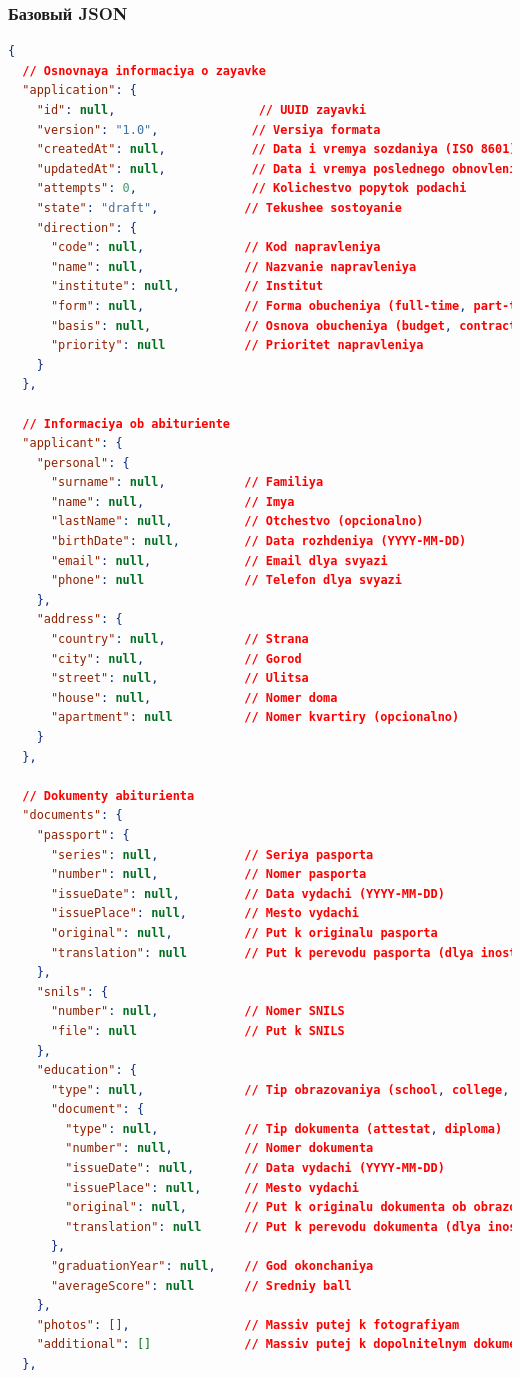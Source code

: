 \documentclass[areasetadvanced]{scrartcl}
\begin{document}
\subsubsection{Базовый JSON}
\begin{lstlisting}[language=json,caption={Bazovyi JSON format zayavki},label={lst:json-base}]
{
  // Osnovnaya informaciya o zayavke
  "application": {
    "id": null,                    // UUID zayavki
    "version": "1.0",             // Versiya formata
    "createdAt": null,            // Data i vremya sozdaniya (ISO 8601)
    "updatedAt": null,            // Data i vremya poslednego obnovleniya (ISO 8601)
    "attempts": 0,                // Kolichestvo popytok podachi
    "state": "draft",            // Tekushee sostoyanie
    "direction": {
      "code": null,              // Kod napravleniya
      "name": null,              // Nazvanie napravleniya
      "institute": null,         // Institut
      "form": null,              // Forma obucheniya (full-time, part-time)
      "basis": null,             // Osnova obucheniya (budget, contract)
      "priority": null           // Prioritet napravleniya
    }
  },

  // Informaciya ob abituriente
  "applicant": {
    "personal": {
      "surname": null,           // Familiya
      "name": null,              // Imya
      "lastName": null,          // Otchestvo (opcionalno)
      "birthDate": null,         // Data rozhdeniya (YYYY-MM-DD)
      "email": null,             // Email dlya svyazi
      "phone": null              // Telefon dlya svyazi
    },
    "address": {
      "country": null,           // Strana
      "city": null,              // Gorod
      "street": null,            // Ulitsa
      "house": null,             // Nomer doma
      "apartment": null          // Nomer kvartiry (opcionalno)
    }
  },

  // Dokumenty abiturienta
  "documents": {
    "passport": {
      "series": null,            // Seriya pasporta
      "number": null,            // Nomer pasporta
      "issueDate": null,         // Data vydachi (YYYY-MM-DD)
      "issuePlace": null,        // Mesto vydachi
      "original": null,          // Put k originalu pasporta
      "translation": null        // Put k perevodu pasporta (dlya inostrancev)
    },
    "snils": {
      "number": null,            // Nomer SNILS
      "file": null               // Put k SNILS
    },
    "education": {
      "type": null,              // Tip obrazovaniya (school, college, university)
      "document": {
        "type": null,            // Tip dokumenta (attestat, diploma)
        "number": null,          // Nomer dokumenta
        "issueDate": null,       // Data vydachi (YYYY-MM-DD)
        "issuePlace": null,      // Mesto vydachi
        "original": null,        // Put k originalu dokumenta ob obrazovanii
        "translation": null      // Put k perevodu dokumenta (dlya inostrancev)
      },
      "graduationYear": null,    // God okonchaniya
      "averageScore": null       // Sredniy ball
    },
    "photos": [],                // Massiv putej k fotografiyam
    "additional": []             // Massiv putej k dopolnitelnym dokumentam
  },


\end{lstlisting}
\end{document}
